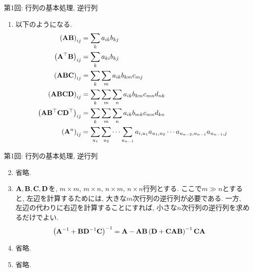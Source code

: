 \documentclass[dvipdfmx,notheorems,t]{beamer}
\begin{document}
\begin{frame}{第1回: 行列の基本処理, 逆行列}
\begin{enumerate}
  \item 以下のようになる.
  \begin{align*}
    \left( \vb{A} \vb{B} \right)_{ij} &= \sum_k a_{ik} b_{kj} \\
    \left( \vb{A}^\top \vb{B} \right)_{ij} &= \sum_k a_{ki} b_{kj} \\
    \left( \vb{A} \vb{B} \vb{C} \right)_{ij} &= \sum_k \sum_m a_{ik} b_{km} c_{mj} \\
    \left( \vb{A} \vb{B} \vb{C} \vb{D} \right)_{ij}
      &= \sum_k \sum_m \sum_n a_{ik} b_{km} c_{mn} d_{nk} \\
    \left( \vb{A} \vb{B}^\top \vb{C} \vb{D}^\top \right)_{ij}
      &= \sum_k \sum_m \sum_n a_{ik} b_{mk} c_{mn} d_{kn} \\
    \left( \vb{A}^n \right)_{ij}
      &= \sum_{u_1} \sum_{u_2} \cdots \sum_{u_{n - 1}}
        a_{i, u_1} a_{u_1, u_2} \cdots a_{u_{n - 2}, u_{n - 1}} a_{u_{n - 1}, j}
  \end{align*}
\end{enumerate}
\end{frame}

\begin{frame}{第1回: 行列の基本処理, 逆行列}
\begin{enumerate}
  \setcounter{enumi}{1}
  \item 省略.
  \item $\vb{A}, \vb{B}, \vb{C}, \vb{D}$を, $m \times m$, $m \times n$, $n \times m$, $n \times n$行列とする.
  ここで$m \gg n$とすると, 左辺を計算するためには, 大きな$m$次行列の逆行列が必要である.
  一方, 左辺の代わりに右辺を計算することにすれば, 小さな$n$次行列の逆行列を求めるだけでよい.
  \begin{align*}
    \left( \vb{A}^{-1} + \vb{B} \vb{D}^{-1} \vb{C} \right)^{-1}
      &= \vb{A} - \vb{A} \vb{B}
        \left( \vb{D} + \vb{C} \vb{A} \vb{B} \right)^{-1} \vb{C} \vb{A}
  \end{align*}
  \item 省略.
  \item 省略.
\end{enumerate}
\end{frame}
\end{document}
